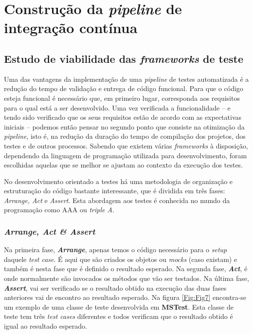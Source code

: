 \chapter[Construção da \textit{pipeline} de integração contínua]{Construção da \textit{pipeline} de integração contínua}
\label{Ch:CapExemplo}
\section{Estudo de viabilidade das \textit{frameworks} de teste}
\label{Ch:OutroCap}

\hspace{1cm}Uma das vantagens da implementação de uma \textit{pipeline} de testes automatizada é a redução do tempo de validação e entrega de código funcional. Para que o código esteja funcional é necessário que, em primeiro lugar, corresponda aos requisitos para o qual está a ser desenvolvido. Uma vez verificada a funcionalidade -- e tendo sido verificado que os seus requisitos estão de acordo com as expectativas iniciais -- podemos então pensar no segundo ponto que consiste na otimização da \textit{pipeline}, isto é, na redução da duração do tempo de compilação dos projetos, dos testes e de outros processos. Sabendo que existem várias \textit{frameworks} à disposição, dependendo da linguagem de programação utilizada para desenvolvimento, foram escolhidas aquelas que se melhor se ajustam ao contexto da execução dos testes.


\hspace{1cm}No desenvolvimento orientado a testes há uma metodologia de organização e estruturação do código bastante interessante, que é dividida em três fases: \textit{Arrange, Act} e \textit{Assert}. Esta abordagem aos testes é conhecida no mundo da programação como AAA ou \textit{triple A}.

\subsection{\textit{Arrange, Act \& Assert}}

\hspace{1cm}Na primeira fase, \textbf{\textit{Arrange}}, apenas temos o código necessário para o \textit{setup} daquele \textit{test case}. É aqui que são criados os objetos ou \textit{mocks} (caso existam) e também é nesta fase que é definido o resultado esperado. Na segunda fase, \textbf{\textit{Act}}, é onde normalmente são invocados os métodos que vão ser testados. Na última fase, \textbf{\textit{Assert}}, vai ser verificado se o resultado obtido na execução das duas fases anteriores vai de encontro ao resultado esperado. Na figura \ref{Fig:Fig7} encontra-se um exemplo de uma classe de teste desenvolvida em \textbf{MSTest}. Esta classe de teste tem três \textit{test cases} diferentes e todos verificam que o resultado obtido é igual ao resultado esperado.

